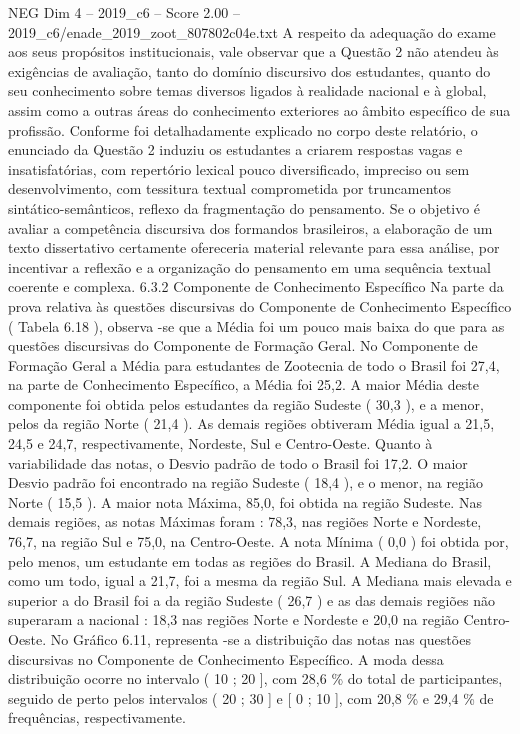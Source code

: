 \begin{textsample}{NEG Dim 4 – 2019\_c6 – Score 2.00 – 2019\_c6/enade\_2019\_zoot\_807802c04e.txt}
A respeito da adequação do exame aos seus propósitos institucionais, vale observar que a Questão 2 não atendeu às exigências de avaliação, tanto do domínio discursivo dos estudantes, quanto do seu conhecimento sobre temas diversos ligados à realidade nacional e à global, assim como a outras áreas do conhecimento exteriores ao âmbito específico de sua profissão.
Conforme foi detalhadamente explicado no corpo deste relatório, o enunciado da Questão 2 induziu os estudantes a criarem respostas vagas e insatisfatórias, com repertório lexical pouco diversificado, impreciso ou sem desenvolvimento, com tessitura textual comprometida por truncamentos sintático-semânticos, reflexo da fragmentação do pensamento.
Se o objetivo é avaliar a competência discursiva dos formandos brasileiros, a elaboração de um texto dissertativo certamente ofereceria material relevante para essa análise, por incentivar a reflexão e a organização do pensamento em uma sequência textual coerente e complexa. 6.3.2 Componente de Conhecimento Específico Na parte da prova relativa às questões discursivas do Componente de Conhecimento Específico ( Tabela 6.18 ), observa -se que a Média foi um pouco mais baixa do que para as questões discursivas do Componente de Formação Geral.
No Componente de Formação Geral a Média para estudantes de Zootecnia de todo o Brasil foi 27,4, na parte de Conhecimento Específico, a Média foi 25,2.
A maior Média deste componente foi obtida pelos estudantes da região Sudeste ( 30,3 ), e a menor, pelos da região Norte ( 21,4 ).
As demais regiões obtiveram Média igual a 21,5, 24,5 e 24,7, respectivamente, Nordeste, Sul e Centro-Oeste.
Quanto à variabilidade das notas, o Desvio padrão de todo o Brasil foi 17,2.
O maior Desvio padrão foi encontrado na região Sudeste ( 18,4 ), e o menor, na região Norte ( 15,5 ).
A maior nota Máxima, 85,0, foi obtida na região Sudeste.
Nas demais regiões, as notas Máximas foram : 78,3, nas regiões Norte e Nordeste, 76,7, na região Sul e 75,0, na Centro-Oeste.
A nota Mínima ( 0,0 ) foi obtida por, pelo menos, um estudante em todas as regiões do Brasil.
A Mediana do Brasil, como um todo, igual a 21,7, foi a mesma da região Sul.
A Mediana mais elevada e superior a do Brasil foi a da região Sudeste ( 26,7 ) e as das demais regiões não superaram a nacional : 18,3 nas regiões Norte e Nordeste e 20,0 na região Centro-Oeste.
No Gráfico 6.11, representa -se a distribuição das notas nas questões discursivas no Componente de Conhecimento Específico.
A moda dessa distribuição ocorre no intervalo ( 10 ; 20 ], com 28,6 \% do total de participantes, seguido de perto pelos intervalos ( 20 ; 30 ] e [ 0 ; 10 ], com 20,8 \% e 29,4 \% de frequências, respectivamente.

\end{textsample}
